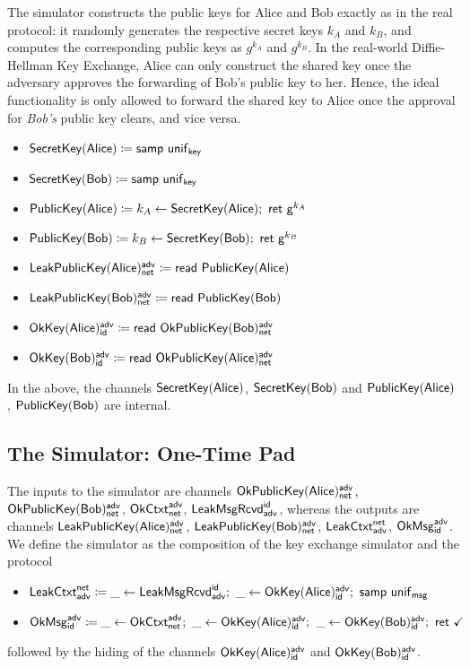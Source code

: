 The simulator constructs the public keys for Alice and Bob exactly as in the real protocol: it randomly generates the respective secret keys $k_A$ and $k_B$, and computes the corresponding public keys as $g^{k_A}$ and $g^{k_B}$. In the real-world Diffie-Hellman Key Exchange, Alice can only construct the shared key once the adversary approves the forwarding of Bob's public key to her. Hence, the ideal functionality is only allowed to forward the shared key to Alice once the approval for \emph{Bob's} public key clears, and vice versa.

\begin{itemize}
\item $\mathsf{SecretKey}(\mathsf{Alice}) \coloneqq \mathsf{samp} \ \mathsf{unif}_{\mathsf{key}}$
\item $\mathsf{SecretKey}(\mathsf{Bob}) \coloneqq \mathsf{samp} \ \mathsf{unif}_{\mathsf{key}}$
\item $\mathsf{PublicKey}(\mathsf{Alice}) \coloneqq k_A \leftarrow \mathsf{SecretKey}(\mathsf{Alice}); \ \mathsf{ret} \ \mathsf{g}^{k_A}$
\item $\mathsf{PublicKey}(\mathsf{Bob}) \coloneqq k_B \leftarrow \mathsf{SecretKey}(\mathsf{Bob}); \ \mathsf{ret} \ \mathsf{g}^{k_B}$
\item $\mathsf{LeakPublicKey}(\mathsf{Alice})^{\mathsf{adv}}_{\mathsf{net}} \coloneqq \mathsf{read} \ \mathsf{PublicKey}(\mathsf{Alice})$
\item $\mathsf{LeakPublicKey}(\mathsf{Bob})^{\mathsf{adv}}_{\mathsf{net}} \coloneqq \mathsf{read} \ \mathsf{PublicKey}(\mathsf{Bob})$
\item $\mathsf{OkKey}(\mathsf{Alice})^{\mathsf{adv}}_{\mathsf{id}} \coloneqq \mathsf{read} \ \mathsf{OkPublicKey}(\mathsf{Bob})^{\mathsf{adv}}_{\mathsf{net}}$
\item $\mathsf{OkKey}(\mathsf{Bob})^{\mathsf{adv}}_{\mathsf{id}} \coloneqq \mathsf{read} \ \mathsf{OkPublicKey}(\mathsf{Alice})^{\mathsf{adv}}_{\mathsf{net}}$
\end{itemize}
In the above, the channels $\mathsf{SecretKey}(\mathsf{Alice})$, $\mathsf{SecretKey}(\mathsf{Bob})$ and $\mathsf{PublicKey}(\mathsf{Alice})$, $\mathsf{PublicKey}(\mathsf{Bob})$ are internal.

\subsection{The Simulator: One-Time Pad}
The inputs to the simulator are channels $\mathsf{OkPublicKey}(\mathsf{Alice})^{\mathsf{adv}}_{\mathsf{net}}$, $\mathsf{OkPublicKey}(\mathsf{Bob})^{\mathsf{adv}}_{\mathsf{net}}$, $\mathsf{OkCtxt}^{\mathsf{adv}}_{\mathsf{net}}$, $\mathsf{LeakMsgRcvd}^{\mathsf{id}}_{\mathsf{adv}}$, whereas the outputs are channels $\mathsf{LeakPublicKey}(\mathsf{Alice})^{\mathsf{adv}}_{\mathsf{net}}$, $\mathsf{LeakPublicKey}(\mathsf{Bob})^{\mathsf{adv}}_{\mathsf{net}}$, $\mathsf{LeakCtxt}^{\mathsf{net}}_{\mathsf{adv}}$, $\mathsf{OkMsg}^{\mathsf{adv}}_{\mathsf{id}}$. We define the simulator as the composition of the key exchange simulator and the protocol
\begin{itemize}
\item $\mathsf{LeakCtxt}^{\mathsf{net}}_{\mathsf{adv}} \coloneqq \_ \leftarrow \mathsf{LeakMsgRcvd}^{\mathsf{id}}_{\mathsf{adv}}; \ \_ \leftarrow \mathsf{OkKey}(\mathsf{Alice})^{\mathsf{adv}}_{\mathsf{id}}; \ \mathsf{samp} \ \mathsf{unif}_{\mathsf{msg}}$
\item $\OkMsg^\adv_\id \coloneqq \_ \leftarrow \OkCtxt^\adv_\net; \ \_ \leftarrow \OkKey(\Alice)^\adv_\id; \ \_ \leftarrow \OkKey(\Bob)^\adv_\id; \ \ret{\checkmark}$
\end{itemize}
followed by the hiding of the channels $\mathsf{OkKey}(\mathsf{Alice})^{\mathsf{adv}}_{\mathsf{id}}$ and $\mathsf{OkKey}(\mathsf{Bob})^{\mathsf{adv}}_{\mathsf{id}}$.

